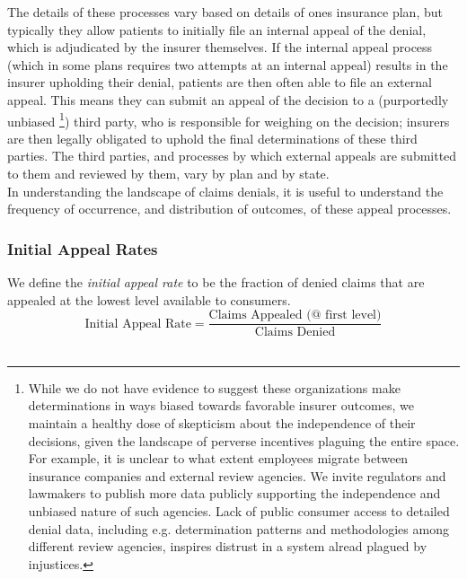 \documentclass[12pt, a4paper]{report}
\begin{document}
The details of these processes vary based on details of ones insurance plan, but typically they allow patients to initially file an internal appeal of the denial, which is adjudicated by the insurer themselves. If the internal appeal process (which in some plans requires two attempts at an internal appeal) results in the insurer upholding their denial, patients are then often able to file an external appeal. This means they can submit an appeal of the decision to a (purportedly unbiased \footnote{While we do not have evidence to suggest these organizations make determinations in ways biased towards favorable insurer outcomes, we maintain a healthy dose of skepticism about the independence of their decisions, given the landscape of perverse incentives plaguing the entire space. For example, it is unclear to what extent employees migrate between insurance companies and external review agencies. We invite regulators and lawmakers to publish more data publicly supporting the independence and unbiased nature of such agencies. Lack of public consumer access to detailed denial data, including e.g. determination patterns and methodologies among different review agencies, inspires distrust in a system alread plagued by injustices.}) third party, who is responsible for weighing on the decision; insurers are then legally obligated to uphold the final determinations of these third parties. The third parties, and processes by which external appeals are submitted to them and reviewed by them, vary by plan and by state.\\

In understanding the landscape of claims denials, it is useful to understand the frequency of occurrence, and distribution of outcomes, of these appeal processes.\\

\subsubsection{Initial Appeal Rates}

We define the \emph{initial appeal rate} to be the fraction of denied claims that are appealed at the lowest level available to consumers.\\

\begin{equation*}
	\text{Initial Appeal Rate} = \dfrac{\text{Claims Appealed (@ first level)}}{\text{Claims Denied}}
\end{equation*}
\hfill\\
\end{document}
